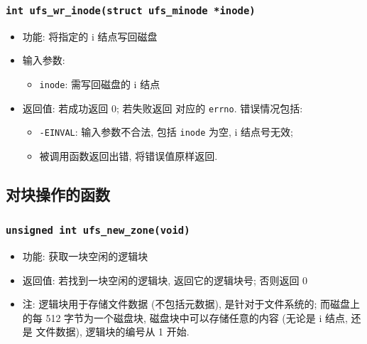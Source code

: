 \documentclass[nofonts, titlepage]{ctexart}
\begin{document}
  \subsubsection[\texttt{ufs\_wr\_inode}]{\texttt{int ufs\_wr\_inode(struct ufs\_minode *inode)}}
  \begin{itemize}
\item
  功能: 将指定的 i 结点写回磁盘
\item
  输入参数:

  \begin{itemize}
  \item
    \texttt{inode}: 需写回磁盘的 i 结点
  \end{itemize}
\item
  返回值: 若成功返回 0; 若失败返回 对应的 \texttt{errno}. 错误情况包括:

  \begin{itemize}
  \item
    \texttt{-EINVAL}: 输入参数不合法, 包括 \texttt{inode} 为空, i
    结点号无效;
  \item
    被调用函数返回出错, 将错误值原样返回.
  \end{itemize}
  \end{itemize}

  \subsection{对块操作的函数}
  \subsubsection[\texttt{ufs\_new\_zone}]{\texttt{unsigned int ufs\_new\_zone(void)}}
  \begin{itemize}
\item
  功能: 获取一块空闲的逻辑块
\item
  返回值: 若找到一块空闲的逻辑块, 返回它的逻辑块号; 否则返回 0
\item
  注: 逻辑块用于存储文件数据 (不包括元数据), 是针对于文件系统的;
  而磁盘上 的每 512 字节为一个磁盘块, 磁盘块中可以存储任意的内容 (无论是
  i 结点, 还是 文件数据), 逻辑块的编号从 1 开始.
  \end{itemize}
\end{document}
